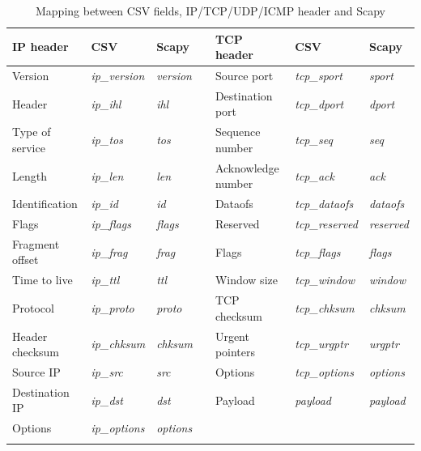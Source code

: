 \begin{table}[htbp]
\caption{Mapping between CSV fields, IP/TCP/UDP/ICMP header and Scapy}
\begin{center}
\begin{tabular}{|l|l|l|l|l|l|l|}
\hline
IP header               & CSV                   & Scapy && TCP header & CSV & Scapy\\
\hline
Version                 & \textit{ip\_version}  & \textit{version}&& Source port & \textit{tcp\_sport} & \textit{sport}\\
\hline
Header                  & \textit{ip\_ihl}      & \textit{ihl}&&Destination port & \textit{tcp\_dport} & \textit{dport}\\
\hline
Type of service         & \textit{ip\_tos}      & \textit{tos}&& Sequence number & \textit{tcp\_seq} & \textit{seq}\\
\hline
Length                  & \textit{ip\_len}      & \textit{len}&& Acknowledge number & \textit{tcp\_ack} & \textit{ack}\\
\hline
Identification          & \textit{ip\_id}       & \textit{id}&& Dataofs & \textit{tcp\_dataofs} & \textit{dataofs}\\
\hline
Flags                   & \textit{ip\_flags}    &\textit{flags}&& Reserved & \textit{tcp\_reserved} & \textit{reserved}\\
\hline
Fragment offset         & \textit{ip\_frag}     &\textit{frag}&& Flags & \textit{tcp\_flags} & \textit{flags}\\
\hline
Time to live            & \textit{ip\_ttl}      &\textit{ttl}&& Window size & \textit{tcp\_window} & \textit{window}\\
\hline
Protocol                & \textit{ip\_proto}    &\textit{proto}&& TCP checksum & \textit{tcp\_chksum} & \textit{chksum}\\
\hline
Header checksum         & \textit{ip\_chksum}   &\textit{chksum}&& Urgent pointers & \textit{tcp\_urgptr} & \textit{urgptr}\\
\hline
Source IP               & \textit{ip\_src}      &\textit{src}&& Options & \textit{tcp\_options} & \textit{options}\\
\hline
Destination IP          & \textit{ip\_dst}      &\textit{dst}&& Payload & \textit{payload} & \textit{payload}\\
\hline
Options                 & \textit{ip\_options}  &\textit{options}&& & & \\
\hline
\multicolumn{7}{|c|}{ }\\

\end{tabular}
\end{center}
\end{table}
